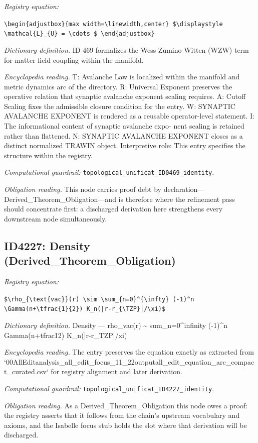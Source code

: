 \documentclass[11pt]{article}
\theoremstyle{remark}
\begin{document}
\noindent\textit{Registry equation:}\par
{\small\texttt{\textbackslash{}begin\{adjustbox\}\{max width=\textbackslash{}linewidth,center\} \$\textbackslash{}displaystyle \textbackslash{}mathcal\{L\}\_\{U\} = \textbackslash{}cdots \$ \textbackslash{}end\{adjustbox\}}}\par\medskip
\noindent\textit{Dictionary definition.} ID 469 formalizes the Wess Zumino Witten (WZW) term for matter field coupling within the manifold.\par\medskip
\noindent\textit{Encyclopedia reading.} T: Avalanche Law is localized within the manifold and metric dynamics arc of the directory. R: Universal Exponent preserves the operative relation that synaptic avalanche exponent scaling requires. A: Cutoff Scaling fixes the admissible closure condition for the entry. W: SYNAPTIC AVALANCHE EXPONENT is rendered as a reusable operator-level statement. I: The informational content of synaptic avalanche expo- nent scaling is retained rather than flattened. N: SYNAPTIC AVALANCHE EXPONENT closes as a distinct normalized TRAWIN object. Interpretive role: This entry specifies the structure within the registry.
\par\medskip\noindent\textit{Computational guardrail:} \texttt{topological\_unificat\_ID0469\_identity}.
\par\medskip\noindent\textit{Obligation reading.} This node carries proof debt by declaration---Derived\_Theorem\_Obligation---and is therefore where the refinement pass should concentrate first: a discharged derivation here strengthens every downstream node simultaneously.

\subsection{ID4227: Density (Derived\_Theorem\_Obligation)}

\noindent\textit{Registry equation:}\par
{\small\texttt{\$\textbackslash{}rho\_\{\textbackslash{}text\{vac\}\}(r) \textbackslash{}sim \textbackslash{}sum\_\{n=0\}\textasciicircum{}\{\textbackslash{}infty\} (-1)\textasciicircum{}n \textbackslash{}Gamma(n+\textbackslash{}tfrac\{1\}\{2\}) K\_n(|r-r\_\{\textbackslash{}TZP\}|/\textbackslash{}xi)\$}}\par\medskip
\noindent\textit{Dictionary definition.} Density --- rho\_vac(r) \textasciitilde{} sum\_n=0\textasciicircum{}infinity (-1)\textasciicircum{}n Gamma(n+tfrac12) K\_n(|r-r\_TZP|/xi)\par\medskip
\noindent\textit{Encyclopedia reading.} The entry preserves the equation exactly as extracted from `00AllEditanalysis\_all\_edit\_focus\_11\_22outputall\_edit\_equation\_arc\_compact\_curated.csv` for registry alignment and later derivation.
\par\medskip\noindent\textit{Computational guardrail:} \texttt{topological\_unificat\_ID4227\_identity}.
\par\medskip\noindent\textit{Obligation reading.} As a Derived\_Theorem\_Obligation this node owes a proof: the registry asserts that it follows from the chain's upstream vocabulary and axioms, and the Isabelle focus stub holds the slot where that derivation will be discharged.
\end{document}

